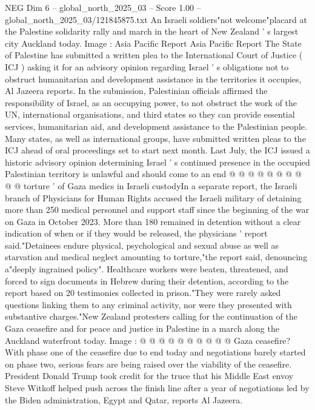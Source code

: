 \begin{textsample}{NEG Dim 6 – global\_north\_2025\_03 – Score 1.00 – global\_north\_2025\_03/121845875.txt}  \label{ex:f6_neg_175}
An Israeli soldiers"not welcome"placard at the Palestine solidarity rally and march in the heart of New Zealand ' s largest city Auckland today.
Image : Asia Pacific Report Asia Pacific Report The State of Palestine has submitted a written plea to the International Court of Justice ( ICJ ) asking it for an advisory opinion regarding Israel ' s obligations not to obstruct humanitarian and development assistance in the territories it occupies, Al Jazeera reports.
In the submission, Palestinian officials affirmed the responsibility of Israel, as an occupying power, to not obstruct the work of the UN, international organisations, and third states so they can provide essential services, humanitarian aid, and development assistance to the Palestinian people.
Many states, as well as international groups, have submitted written pleas to the ICJ ahead of oral proceedings set to start next month.
Last July, the ICJ issued a historic advisory opinion determining Israel ' s continued presence in the occupied Palestinian territory is unlawful and should come to an end @ @ @ @ @ @ @ @ @ @ torture ' of Gaza medics in Israeli custodyIn a separate report, the Israeli branch of Physicians for Human Rights accused the Israeli military of detaining more than 250 medical personnel and support staff since the beginning of the war on Gaza in October 2023.
More than 180 remained in detention without a clear indication of when or if they would be released, the physicians ' report said."Detainees endure physical, psychological and sexual abuse as well as starvation and medical neglect amounting to torture,"the report said, denouncing a"deeply ingrained policy".
Healthcare workers were beaten, threatened, and forced to sign documents in Hebrew during their detention, according to the report based on 20 testimonies collected in prison."They were rarely asked questions linking them to any criminal activity, nor were they presented with substantive charges."New Zealand protesters calling for the continuation of the Gaza ceasefire and for peace and justice in Palestine in a march along the Auckland waterfront today.
Image : @ @ @ @ @ @ @ @ @ @ Gaza ceasefire?
With phase one of the ceasefire due to end today and negotiations barely started on phase two, serious fears are being raised over the viability of the ceasefire.
President Donald Trump took credit for the truce that his Middle East envoy Steve Witkoff helped push across the finish line after a year of negotiations led by the Biden administration, Egypt and Qatar, reports Al Jazeera.

\end{textsample}
